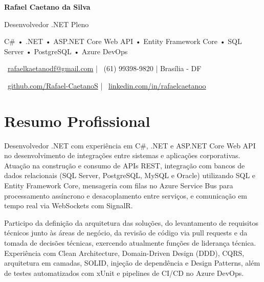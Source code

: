 \documentclass[11pt,a4paper]{article}
\begin{document}

\begin{center}

{\Huge\bfseries Rafael Caetano da Silva}

\vspace{5pt}

{\Large Desenvolvedor .NET Pleno}

\vspace{4pt}

{\small
C\# • .NET • ASP.NET Core Web API • Entity Framework Core • SQL Server • PostgreSQL • Azure DevOps
}

\vspace{6pt}

\small

\faEnvelope\
\href{mailto:rafaelkaetanodf@gmail.com}{rafaelkaetanodf@gmail.com}
\quad|\quad
\faPhone\
(61) 99398-9820
\quad|\quad
\faMapMarker*
Brasília - DF

\vspace{3pt}

\faGithub\
\href{https://github.com/Rafael-CaetanoS}{github.com/Rafael-CaetanoS}
\quad|\quad
\faLinkedin\
\href{https://linkedin.com/in/rafaelcaetanoo}{linkedin.com/in/rafaelcaetanoo}

\end{center}

\vspace{-0.2cm}
\section{Resumo Profissional}

Desenvolvedor .NET com experiência em C\#, .NET e ASP.NET Core Web API no desenvolvimento de integrações entre sistemas e aplicações corporativas. Atuação na construção e consumo de APIs REST, integração com bancos de dados relacionais (SQL Server, PostgreSQL, MySQL e Oracle) utilizando SQL e Entity Framework Core, mensageria com filas no Azure Service Bus para processamento assíncrono e desacoplamento entre serviços, e comunicação em tempo real via WebSockets com SignalR.

\vspace{0.15cm}

Participo da definição da arquitetura das soluções, do levantamento de requisitos técnicos junto às áreas de negócio, da revisão de código via pull requests e da tomada de decisões técnicas, exercendo atualmente funções de liderança técnica. Experiência com Clean Architecture, Domain-Driven Design (DDD), CQRS, arquitetura em camadas, SOLID, injeção de dependência e Design Patterns, além de testes automatizados com xUnit e pipelines de CI/CD no Azure DevOps.
\end{document}
